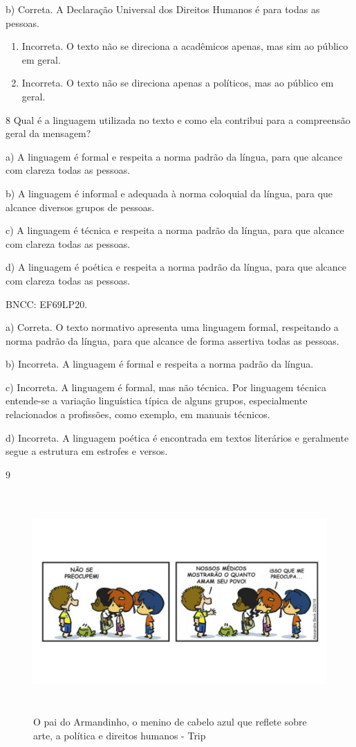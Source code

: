 b) Correta. A Declaração Universal dos Direitos Humanos é para todas as
pessoas.

\begin{enumerate}
\def\labelenumi{\alph{enumi})}
\setcounter{enumi}{2}
\item
  Incorreta. O texto não se direciona a acadêmicos apenas, mas sim ao
  público em geral.
\item
  Incorreta. O texto não se direciona apenas a políticos, mas ao público
  em geral.
\end{enumerate}

\num{8} Qual é a linguagem utilizada no texto e como ela contribui para
a compreensão geral da mensagem?

a) A linguagem é formal e respeita a norma padrão da língua, para que
alcance com clareza todas as pessoas.

b) A linguagem é informal e adequada à norma coloquial da língua, para
que alcance diversos grupos de pessoas.

c) A linguagem é técnica e respeita a norma padrão da língua, para que
alcance com clareza todas as pessoas.

d) A linguagem é poética e respeita a norma padrão da língua, para que
alcance com clareza todas as pessoas.

BNCC: EF69LP20.

a) Correta. O texto normativo apresenta uma linguagem formal,
respeitando a norma padrão da língua, para que alcance de forma
assertiva todas as pessoas.

b) Incorreta. A linguagem é formal e respeita a norma padrão da língua.

c) Incorreta. A linguagem é formal, mas não técnica. Por linguagem
técnica entende-se a variação linguística típica de alguns grupos,
especialmente relacionados a profissões, como exemplo, em manuais
técnicos.

d) Incorreta. A linguagem poética é encontrada em textos literários e
geralmente segue a estrutura em estrofes e versos.

\num{9}

\begin{figure}
\centering
\includegraphics[width=5.90556in,height=3.32222in]{./imgSAEB_6_POR/media/image45.jpeg}
\caption{O pai do Armandinho, o menino de cabelo azul que reflete sobre
arte, a política e direitos humanos - Trip}
\end{figure}

